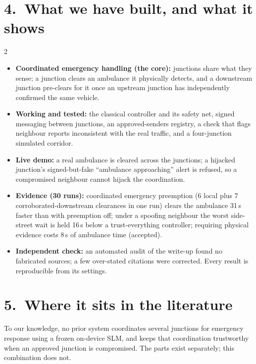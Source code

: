 \documentclass[11pt]{article}
\newcommand{\hd}[1]{{\color{nbblue}\textbf{#1}}}
\begin{document}
\section{4.\ What we have built, and what it shows}
\begin{multicols}{2}
\begin{itemize}
\item \hd{Coordinated emergency handling (the core):} junctions share what they sense; a junction clears an ambulance it physically detects, and a downstream junction pre-clears for it once an upstream junction has independently confirmed the same vehicle.
\item \hd{Working and tested:} the classical controller and its safety net, signed messaging between junctions, an approved-senders registry, a check that flags neighbour reports inconsistent with the real traffic, and a four-junction simulated corridor.
\item \hd{Live demo:} a real ambulance is cleared across the junctions; a hijacked junction's signed-but-fake ``ambulance approaching'' alert is refused, so a compromised neighbour cannot hijack the coordination.
\item \hd{Evidence (30 runs):} coordinated emergency preemption (6 local plus 7 corroborated-downstream clearances in one run) clears the ambulance 31\,s faster than with preemption off; under a spoofing neighbour the worst side-street wait is held 16\,s below a trust-everything controller; requiring physical evidence costs 8\,s of ambulance time (accepted).
\item \hd{Independent check:} an automated audit of the write-up found no fabricated sources; a few over-stated citations were corrected. Every result is reproducible from its settings.
\end{itemize}
\end{multicols}

\vspace{2pt}
\section{5.\ Where it sits in the literature}
To our knowledge, no prior system coordinates several junctions for emergency response using a frozen on-device SLM, and keeps that coordination trustworthy when an approved junction is compromised. The parts exist separately; this combination does not.
\end{document}
